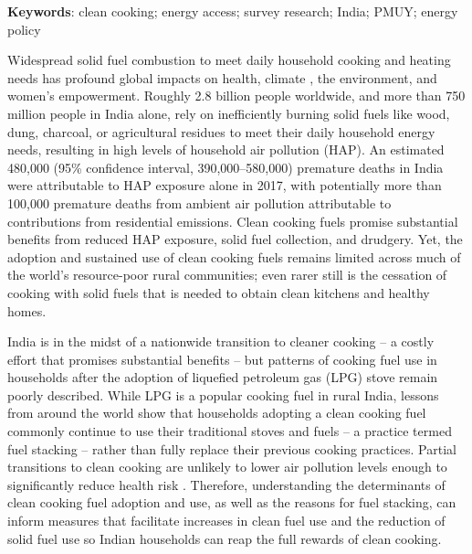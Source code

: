 \documentclass[11pt,english]{article}
\theoremstyle{plain} \newtheorem{claim}{Claim}
\theoremstyle{plain} \newtheorem{prop}{Proposition}
\theoremstyle{plain} \newtheorem{hypo}{Hypothesis}
\begin{document}
\textbf{Keywords}: clean cooking; energy access; survey research; India; PMUY; energy policy

\clearpage

\doublespacing

Widespread solid fuel combustion to meet daily household cooking and heating needs has profound global impacts on health\citep{Stanawayetal2018,HEI2018}, climate \citep{Bondetal2004}, the environment\citep{Bailisetal2015}, and women's empowerment\citep{Rosenthaletal2018}. Roughly 2.8 billion people worldwide\citep{Bonjouretal2013}, and more than 750 million people in India alone\citep{Balakrishnanetal2019}, rely on inefficiently burning solid fuels like wood, dung, charcoal, or agricultural residues to meet their daily household energy needs, resulting in high levels of household air pollution (HAP). An estimated 480,000 (95\% confidence interval, 390,000--580,000) premature deaths in India were attributable to HAP exposure alone in 2017\citep{Balakrishnanetal2019}, with potentially more than 100,000 premature deaths from ambient air pollution attributable to contributions from residential emissions\citep{Chowdhuryetal2019a}. Clean cooking fuels promise substantial benefits from reduced HAP exposure, solid fuel collection, and drudgery. Yet, the adoption and sustained use of clean cooking fuels remains limited across much of the world's resource-poor rural communities; even rarer still is the cessation of cooking with solid fuels that is needed to obtain clean kitchens and healthy homes\citep{Popeetal2017}.

India is in the midst of a nationwide transition to cleaner cooking -- a costly effort that promises substantial benefits -- but patterns of cooking fuel use in households after the adoption of liquefied petroleum gas (LPG) stove remain poorly described. While LPG is a popular cooking fuel in rural India\citep{GouldUrpelainen2018}, lessons from around the world show that households adopting a clean cooking fuel commonly continue to use their traditional stoves and fuels -- a practice termed fuel stacking -- rather than fully replace their previous cooking practices\citep{RuizMercadoMasera2015,Pillarisettietal2014}. Partial transitions to clean cooking are unlikely to lower air pollution levels enough to significantly reduce health risk \citep{JohnsonChiang2015}. Therefore, understanding the determinants of clean cooking fuel adoption and use, as well as the reasons for fuel stacking, can inform measures that facilitate increases in clean fuel use and the reduction of solid fuel use so Indian households can reap the full rewards of clean cooking. 
\end{document}
